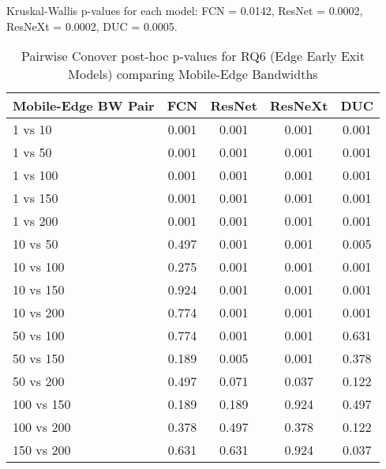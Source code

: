 \begin{table}[h]
\centering
\caption{Pairwise Conover post-hoc p-values for RQ6 (Edge Early Exit Models) comparing Mobile-Edge Bandwidths}
\label{tab:conover_edge_earlyexit}
\smallskip
Kruskal-Wallis p-values for each model: FCN = 0.0142, ResNet = 0.0002, ResNeXt = 0.0002, DUC = 0.0005.

\begin{tabular}{lcccc}
\toprule
Mobile-Edge BW Pair & FCN & ResNet & ResNeXt & DUC \\
\midrule
1 vs 10 & 0.001 & 0.001 & 0.001 & 0.001 \\
1 vs 50 & 0.001 & 0.001 & 0.001 & 0.001 \\
1 vs 100 & 0.001 & 0.001 & 0.001 & 0.001 \\
1 vs 150 & 0.001 & 0.001 & 0.001 & 0.001 \\
1 vs 200 & 0.001 & 0.001 & 0.001 & 0.001 \\
10 vs 50 & 0.497 & 0.001 & 0.001 & 0.005 \\
10 vs 100 & 0.275 & 0.001 & 0.001 & 0.001 \\
10 vs 150 & 0.924 & 0.001 & 0.001 & 0.001 \\
10 vs 200 & 0.774 & 0.001 & 0.001 & 0.001 \\
50 vs 100 & 0.774 & 0.001 & 0.001 & 0.631 \\
50 vs 150 & 0.189 & 0.005 & 0.001 & 0.378 \\
50 vs 200 & 0.497 & 0.071 & 0.037 & 0.122 \\
100 vs 150 & 0.189 & 0.189 & 0.924 & 0.497 \\
100 vs 200 & 0.378 & 0.497 & 0.378 & 0.122 \\
150 vs 200 & 0.631 & 0.631 & 0.924 & 0.037 \\
\bottomrule
\end{tabular}
\end{table}

